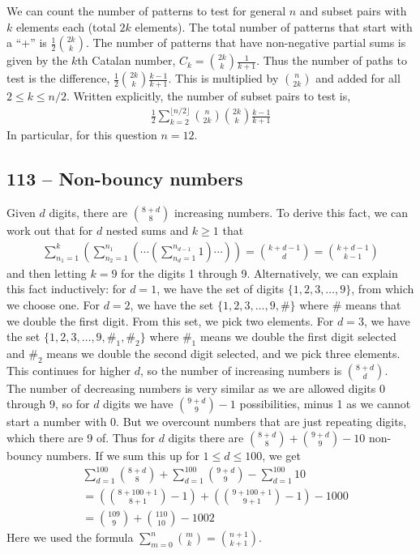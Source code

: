 \documentclass{article}
\begin{document}
We can count the number of patterns to test for general $n$ and subset pairs with $k$ elements each (total $2k$ elements).
The total number of patterns that start with a ``+'' is $\frac{1}{2}\binom{2k}{k}$.
The number of patterns that have non-negative partial sums is given by the $k$th Catalan number, $C_k = \binom{2k}{k} \frac{1}{k+1}$.
Thus the number of paths to test is the difference, $\frac{1}{2}\binom{2k}{k} \frac{k-1}{k+1}$.
This is multiplied by $\binom{n}{2k}$ and added for all $2 \leq k \leq n/2$.
Written explicitly, the number of subset pairs to test is,
\begin{align*}
	\boxed{ \frac{1}{2}\sum_{k=2}^{\lfloor{n/2}\rfloor} \binom{n}{2k} \binom{2k}{k} \frac{k-1}{k+1} }
\end{align*}
In particular, for this question $n = 12$.


\subsection*{113 -- Non-bouncy numbers}
Given $d$ digits, there are $\binom{8+d}{8}$ increasing numbers.
To derive this fact, we can work out that for $d$ nested sums and $k \geq 1$ that
\begin{align*}
	\sum_{n_1=1}^k \left( \sum_{n_2=1}^{n_1} \left( \cdots \left(\sum_{n_d=1}^{n_{d-1}} 1\right) \cdots \right) \right) = \binom{k+d-1}{d} = \binom{k+d-1}{k-1}
\end{align*}
and then letting $k=9$ for the digits 1 through 9.
Alternatively, we can explain this fact inductively: for $d=1$, we have the set of digits $\{1, 2, 3, \dotsc, 9\}$, from which we choose one.
For $d=2$, we have the set $\{1, 2, 3, \dotsc, 9, \#\}$ where $\#$ means that we double the first digit.
From this set, we pick two elements.
For $d=3$, we have the set $\{1, 2, 3, \dotsc, 9, \#_1, \#_2\}$ where $\#_1$ means we double the first digit selected and $\#_2$ means we double the second digit selected, and we pick three elements.
This continues for higher $d$, so the number of increasing numbers is $\binom{8+d}{d}$.\\

The number of decreasing numbers is very similar as we are allowed digits 0 through 9, so for $d$ digits we have $\binom{9+d}{9}-1$ possibilities, minus 1 as we cannot start a number with 0.
But we overcount numbers that are just repeating digits, which there are 9 of.
Thus for $d$ digits there are $\binom{8+d}{8} + \binom{9+d}{9} - 10$ non-bouncy numbers.
If we sum this up for $1 \leq d \leq 100$, we get
\begin{align*}
	& \sum_{d=1}^{100} \binom{8+d}{8} + \sum_{d=1}^{100} \binom{9+d}{9} - \sum_{d=1}^{100} 10 \\
	& = \left( \binom{8+100+1}{8+1} - 1 \right) + \left( \binom{9+100+1}{9+1} - 1 \right) - 1000 \\
	& = \boxed{ \binom{109}{9} + \binom{110}{10} - 1002 }
\end{align*}
Here we used the formula $\sum\limits_{m=0}^n \binom{m}{k} = \binom{n+1}{k+1}$.
\end{document}
